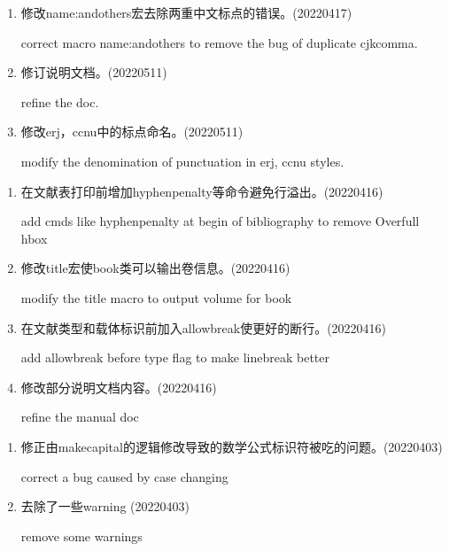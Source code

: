 \label{up:20220517}
\begin{enumerate}

\item 修改name:andothers宏去除两重中文标点的错误。(20220417)

correct macro name:andothers to remove the bug of duplicate cjkcomma.

\item 修订说明文档。(20220511)

refine the doc.

\item 修改erj，ccnu中的标点命名。(20220511)

modify the denomination of punctuation in erj, ccnu styles.

\end{enumerate}

\label{up:20220416}
\begin{enumerate}

\item 在文献表打印前增加hyphenpenalty等命令避免行溢出。(20220416)

add cmds like hyphenpenalty at begin of bibliography to remove Overfull hbox

\item 修改title宏使book类可以输出卷信息。(20220416)

modify the title macro to output volume for book

\item 在文献类型和载体标识前加入allowbreak使更好的断行。(20220416)

add allowbreak before type flag to make linebreak better

\item 修改部分说明文档内容。(20220416)

refine the manual doc

\end{enumerate}


\label{up:20220403}
\begin{enumerate}

\item 修正由makecapital的逻辑修改导致的数学公式标识符被吃的问题。(20220403)

correct a bug caused by case changing

\item 去除了一些warning (20220403)

remove some warnings


\end{enumerate}



